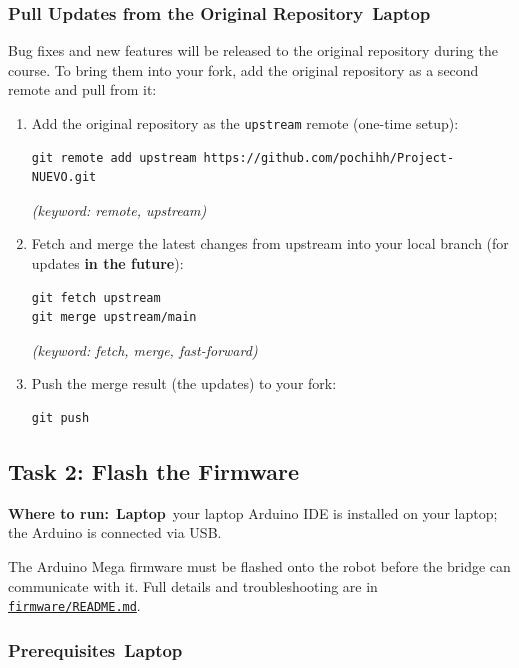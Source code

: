 \documentclass{ol-softwaremanual}
\newcommand{\onlaptop}{%
  \,\colorbox{green!25}{\footnotesize\sffamily\bfseries Laptop}}
\newcommand{\machinebox}[2]{%
  \par\noindent
  \colorbox{gray!12}{\parbox{\dimexpr\linewidth-2\fboxsep}{%
    \small\sffamily\textbf{Where to run:} #1 \quad\textbar\quad #2}}%
  \par\smallskip}
\newcommand{\doclink}[2]{\href{#1}{#2}}
\begin{document}
\subsubsection{Pull Updates from the Original Repository\onlaptop}

Bug fixes and new features will be released to the original repository during the
course.
To bring them into your fork, add the original repository as a second remote and
pull from it:

\begin{enumerate}
  \item Add the original repository as the \texttt{upstream} remote (one-time setup):
\begin{verbatim}
git remote add upstream https://github.com/pochihh/Project-NUEVO.git
\end{verbatim}
        \hfill\textit{(keyword: remote, upstream)}

  \item Fetch and merge the latest changes from upstream into your local branch (for updates \textbf{in the future}):
\begin{verbatim}
git fetch upstream
git merge upstream/main
\end{verbatim}
        \hfill\textit{(keyword: fetch, merge, fast-forward)}

  \item Push the merge result (the updates) to your fork:
\begin{verbatim}
git push
\end{verbatim}
\end{enumerate}


\subsection{Task 2: Flash the Firmware}\label{sec:task2}

\machinebox{\onlaptop\ your laptop}{Arduino IDE is installed on your laptop; the Arduino is connected via USB.}

The Arduino Mega firmware must be flashed onto the robot before the bridge can
communicate with it.
Full details and troubleshooting are in
\doclink{https://github.com/pochihh/Project-NUEVO/blob/main/firmware/README.md}{\texttt{firmware/\allowbreak README.md}}.

\subsubsection{Prerequisites\onlaptop}
\end{document}
